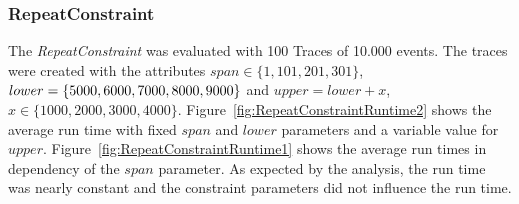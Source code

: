 \subsubsection{RepeatConstraint}
	\label{sec_runtimeRepeat}
	The \textit{RepeatConstraint} was evaluated with 100 Traces of 10.000 events. The traces were created with the attributes $span\in\{1,101,201,301\}$, $lower=\{5000,6000,7000,\\8000,9000\}$ and $upper=lower+x$, $x\in\{1000,2000,3000,4000\}$.  Figure~\ref{fig:RepeatConstraintRuntime2} shows the average run time with fixed $span$ and $lower$ parameters and a variable value for $upper$.  Figure~\ref{fig:RepeatConstraintRuntime1} shows the average run times in dependency of the $span$ parameter. As expected by the analysis, the run time was nearly constant and the constraint parameters did not influence the run time.
%	
